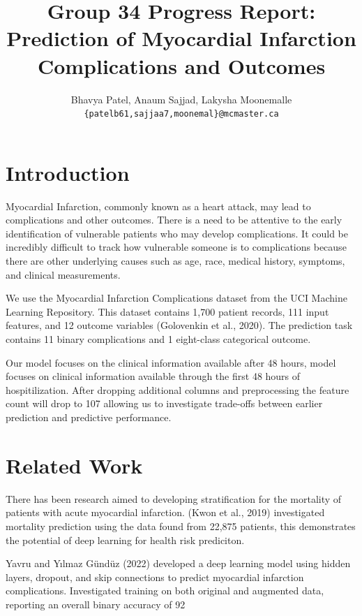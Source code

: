 \documentclass[11pt]{article}
\title{Group 34 Progress Report:\\Prediction of Myocardial Infarction Complications and Outcomes}
\author{Bhavya Patel, Anaum Sajjad, Lakysha Moonemalle\\
  \texttt{\{patelb61,sajjaa7,moonemal\}@mcmaster.ca} }
\begin{document}
\maketitle


\section{Introduction}

Myocardial Infarction, commonly known as a heart attack, may lead to complications and other outcomes. There is a need to be attentive to the early identification of vulnerable patients who may develop complications. It could be incredibly difficult to track how vulnerable someone is to complications because there are other underlying causes such as age, race, medical history, symptoms, and clinical measurements.

We use the Myocardial Infarction Complications dataset from the UCI Machine Learning Repository. This dataset contains 1,700 patient records, 111 input features, and 12 outcome variables (Golovenkin et al., 2020). The prediction task contains 11 binary complications and 1 eight-class categorical outcome.

Our model focuses on the clinical information available after 48 hours, model focuses on clinical information available through the first 48 hours of hospitilization.  After dropping additional columns and preprocessing the feature count will drop to 107 allowing us to investigate trade-offs between earlier prediction and predictive performance.

\section{Related Work}

There has been research aimed to developing stratification for the mortality of patients with acute myocardial infarction. (Kwon et al., 2019) investigated mortality prediction using the data found from 22,875 patients, this demonstrates the potential of deep learning for health risk prediciton.

Yavru and Yılmaz Gündüz (2022) developed a deep learning model using hidden layers, dropout, and skip connections to predict myocardial infarction complications. Investigated training on both original and augmented data, reporting an overall binary accuracy of 92%
\end{document}

